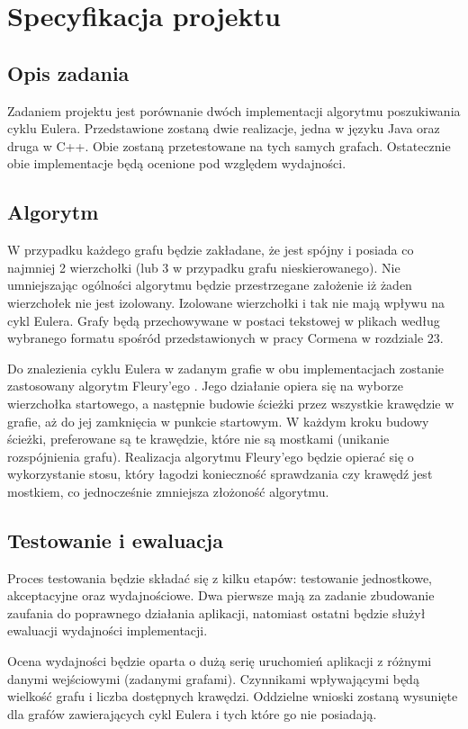 \section{Specyfikacja projektu}

\subsection{Opis zadania}

Zadaniem projektu jest porównanie dwóch implementacji algorytmu poszukiwania cyklu Eulera. 
Przedstawione zostaną dwie realizacje, jedna w języku Java oraz druga w C++. 
Obie zostaną przetestowane na tych samych grafach. 
Ostatecznie obie implementacje będą ocenione pod względem wydajności.

\subsection{Algorytm}

W przypadku każdego grafu będzie zakładane, że jest spójny i posiada co najmniej 2 wierzchołki (lub 3 w przypadku grafu nieskierowanego). 
Nie umniejszając ogólności algorytmu będzie przestrzegane założenie iż żaden wierzchołek nie jest izolowany. 
Izolowane wierzchołki i tak nie mają wpływu na cykl Eulera. 
Grafy będą przechowywane w postaci tekstowej w plikach według wybranego formatu spośród przedstawionych w pracy Cormena \cite{Cormen} w rozdziale 23.

Do znalezienia cyklu Eulera w zadanym grafie w obu implementacjach zostanie zastosowany algorytm Fleury'ego \cite{Wojciechowski}. 
Jego działanie opiera się na wyborze wierzchołka startowego, a następnie budowie ścieżki przez wszystkie krawędzie w grafie, aż do jej zamknięcia w punkcie startowym. 
W każdym kroku budowy ścieżki, preferowane są te krawędzie, które nie są mostkami (unikanie rozspójnienia grafu).
Realizacja algorytmu Fleury'ego będzie opierać się o wykorzystanie stosu, który łagodzi konieczność sprawdzania czy krawędź jest mostkiem, co jednocześnie zmniejsza złożoność algorytmu.

\subsection{Testowanie i ewaluacja}

Proces testowania będzie składać się z kilku etapów: testowanie jednostkowe, akceptacyjne oraz wydajnościowe. 
Dwa pierwsze mają za zadanie zbudowanie zaufania do poprawnego działania aplikacji, natomiast ostatni będzie służył ewaluacji wydajności implementacji. 

Ocena wydajności będzie oparta o dużą serię uruchomień aplikacji z różnymi danymi wejściowymi (zadanymi grafami). 
Czynnikami wpływającymi będą wielkość grafu i liczba dostępnych krawędzi. 
Oddzielne wnioski zostaną wysunięte dla grafów zawierających cykl Eulera i tych które go nie posiadają. 
